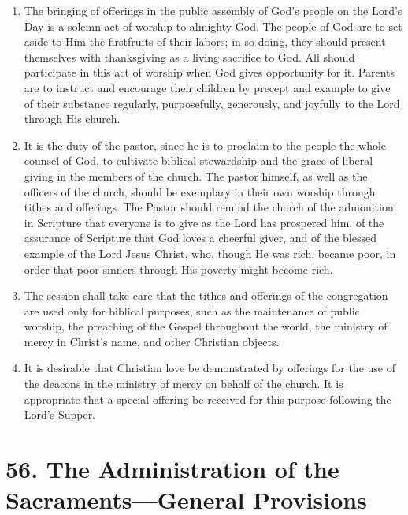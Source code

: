 \documentclass[
]{book}
\providecommand{\tightlist}{%
  \setlength{\itemsep}{0pt}\setlength{\parskip}{0pt}}
\begin{document}
\begin{enumerate}
  \begin{enumerate}
  \def\labelenumii{\alph{enumii}.}
  \tightlist
  \item
    The bringing of offerings in the public assembly of God's people on the Lord's Day is a solemn act of worship to almighty God. The people of God are to set aside to Him the firstfruits of their labors; in so doing, they should present themselves with thanksgiving as a living sacrifice to God. All should participate in this act of worship when God gives opportunity for it. Parents are to instruct and encourage their children by precept and example to give of their substance regularly, purposefully, generously, and joyfully to the Lord through His church.
  \item
    It is the duty of the pastor, since he is to proclaim to the people the whole counsel of God, to cultivate biblical stewardship and the grace of liberal giving in the members of the church. The pastor himself, as well as the officers of the church, should be exemplary in their own worship through tithes and offerings. The Pastor should remind the church of the admonition in Scripture that everyone is to give as the Lord has prospered him, of the assurance of Scripture that God loves a cheerful giver, and of the blessed example of the Lord Jesus Christ, who, though He was rich, became poor, in order that poor sinners through His poverty might become rich.
  \item
    The session shall take care that the tithes and offerings of the congregation are used only for biblical purposes, such as the maintenance of public worship, the preaching of the Gospel throughout the world, the ministry of mercy in Christ's name, and other Christian objects.
  \item
    It is desirable that Christian love be demonstrated by offerings for the use of the deacons in the ministry of mercy on behalf of the church. It is appropriate that a special offering be received for this purpose following the Lord's Supper.
  \end{enumerate}
\end{enumerate}

\hypertarget{the-administration-of-the-sacramentsgeneral-provisions}{%
\section*{56. The Administration of the Sacraments---General Provisions}\label{the-administration-of-the-sacramentsgeneral-provisions}}
\end{document}
